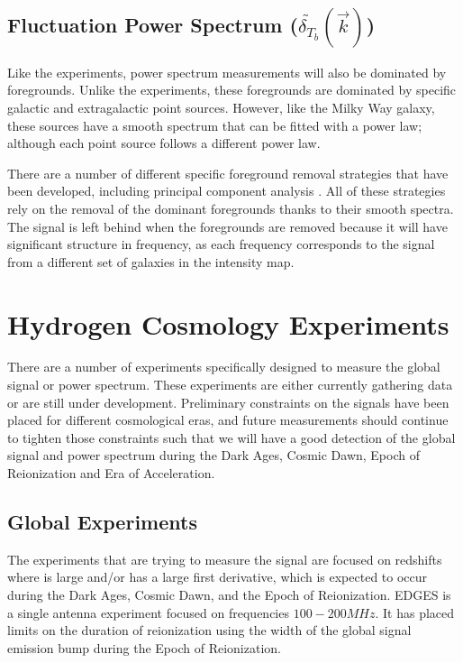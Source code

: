 \subsection{Fluctuation Power Spectrum ($ \tilde{ \delta_{T_b} } ( \vec{k} )$)}
Like the \avgdtb experiments, power spectrum measurements will also be dominated by foregrounds. Unlike the \avgdtb experiments, these foregrounds are dominated by specific galactic and extragalactic point sources. However, like the Milky Way galaxy, these sources have a smooth spectrum that can be fitted with a power law; although each point source follows a different power law. 

There are a number of different specific foreground removal strategies that have been developed, including principal component analysis \cite{masui_2012}\cite{switzer_2013}. All of these strategies rely on the removal of the dominant foregrounds thanks to their smooth spectra. The \cm signal is left behind when the foregrounds are removed because it will have significant structure in frequency, as each frequency corresponds to  the signal from a different set of galaxies in the intensity map. 

\section{Hydrogen \cm Cosmology Experiments}
There are a number of experiments specifically designed to measure the \cm global signal or power spectrum. These experiments are either currently gathering data or are still under development. Preliminary constraints on the \cm signals have been placed for different cosmological eras, and future measurements should continue to tighten those constraints such that we will have a good detection of the \cm global signal and power spectrum during the Dark Ages, Cosmic Dawn, Epoch of Reionization and Era of Acceleration. 

\subsection{Global Experiments}
The experiments that are trying to measure the \avgdtb signal are focused on redshifts where \dtb is large and/or has a large first derivative, which is expected to occur during the Dark Ages, Cosmic Dawn, and the Epoch of Reionization. EDGES \cite{bowman_2008} is a single antenna experiment focused on frequencies $100-200 MHz$. It has placed limits on the duration of reionization using the width of the \cm global signal emission bump during the Epoch of Reionization. 

